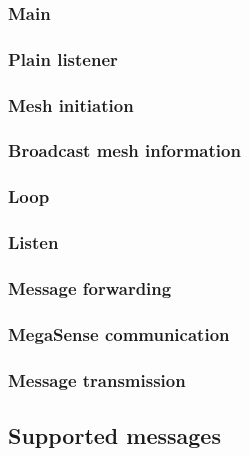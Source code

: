 			\subsubsection{Main}
			
			\subsubsection{Plain listener}
	
			\subsubsection{Mesh initiation}
			
			\subsubsection{Broadcast mesh information}
			
			
			\subsubsection{Loop}
			
			\subsubsection{Listen}
			
			\subsubsection{Message forwarding}
			
			\subsubsection{MegaSense communication}
			
			\subsubsection{Message transmission}
			
		\subsection{Supported messages}
		
